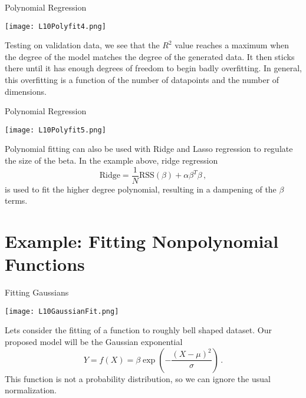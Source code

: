 \documentclass[10pt, table, dvipsnames,xcdraw, handout]{beamer}
\begin{document}
\begin{frame}[fragile]{Polynomial Regression}
  \begin{minipage}[t][0.5\textheight][t]{\textwidth}
	\centering \texttt{[image: L10Polyfit4.png]}
  \end{minipage}
  \vfill
\begin{minipage}[t][0.5\textheight][t]{\textwidth}
Testing on validation data, we see that the $R^2$ value reaches a maximum when the degree of the model matches the degree of the generated data. It then sticks there until it has enough degrees of freedom to begin badly overfitting. In general, this overfitting is a function of the number of datapoints and the number of dimensions.
\end{minipage}
\end{frame}


\begin{frame}[fragile]{Polynomial Regression}
  \begin{minipage}[t][0.5\textheight][t]{\textwidth}
	\centering \texttt{[image: L10Polyfit5.png]}
  \end{minipage}
  \vfill
\begin{minipage}[t][0.5\textheight][t]{\textwidth}
Polynomial fitting can also be used with Ridge and Lasso regression to regulate the size of the beta. In the example above, ridge regression
$$
\text{Ridge} = \frac{1}{N}\text{RSS}(\beta) + \alpha \beta^T\beta\, ,
$$
is used to fit the higher degree polynomial, resulting in a dampening of the $\beta$ terms. 
\end{minipage}
\end{frame}









\section{Example: Fitting Nonpolynomial Functions}


\begin{frame}[fragile]{Fitting Gaussians}
  \begin{minipage}[t][0.5\textheight][t]{\textwidth}
	\centering \texttt{[image: L10GaussianFit.png]}
  \end{minipage}
  \vfill
\begin{minipage}[t][0.5\textheight][t]{\textwidth}
Lets consider the fitting of a function to roughly bell shaped dataset. Our proposed model will be the Gaussian exponential
$$
Y = f(X) = \beta \exp\left(-\frac{(X-\mu)^2}{\sigma}\right)\,.
$$ 
This function is not a probability distribution, so we can ignore the usual normalization.
\end{minipage}
\end{frame}
\end{document}
